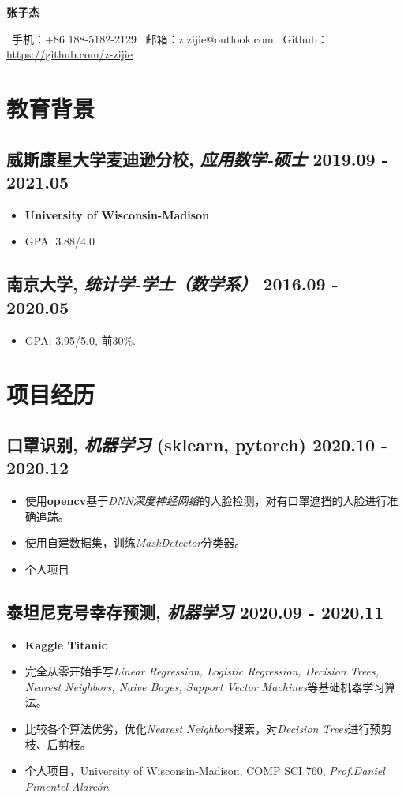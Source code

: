 \documentclass[11pt]{article}
\newcommand{\datedsubsection}[2]{%
    \subsection[#1]{#1 \hfill #2}%
}
\newcommand{\name}[1]{
    \centerline{\Huge\scshape\textbf{#1}}
    \vspace{1.2ex}
}
\newcommand{\contactInfo}[3]{
    \centerline{
        \sffamily\large{
            \ 手机：{#1} \textperiodcentered
            \ 邮箱：{#2} \textperiodcentered
            \ {Github}：\normalsize\url{#3}
            }
        } 
    \vspace{1.2ex}
}
\begin{document}
\name{张子杰}
\contactInfo{+86 188-5182-2129}{z.zijie@outlook.com}{https://github.com/z-zijie}

\section{\textbf{教育背景}}
\datedsubsection{
    \textbf{威斯康星大学麦迪逊分校},
    \textit{应用数学-硕士}}
    {2019.09 - 2021.05}
    \begin{itemize} [parsep=1ex]
        \item \textbf{University of Wisconsin-Madison}
        \item GPA: 3.88/4.0
    \end{itemize}

\datedsubsection{
    \textbf{南京大学},
    \textit{统计学-学士（数学系）}}
    {2016.09 - 2020.05}
    \begin{itemize} [parsep=1ex]
        \item GPA: 3.95/5.0, 前30\%.
    \end{itemize}

\hspace*{\fill}
\section{\textbf{项目经历}}
\datedsubsection{
    \textbf{口罩识别},
    \textit{机器学习}
    (sklearn, pytorch)}
    {2020.10 - 2020.12}
    \begin{itemize} [parsep=1ex]
        \item 使用\textbf{opencv}基于\textit{DNN深度神经网络}的人脸检测，对有口罩遮挡的人脸进行准确追踪。
        \item 使用自建数据集，训练\textit{MaskDetector}分类器。
        \item 个人项目
    \end{itemize}

\datedsubsection{
    \textbf{泰坦尼克号幸存预测},
    \textit{机器学习}}
    {2020.09 - 2020.11}
    \begin{itemize} [parsep=1ex]
        \item \textbf{Kaggle Titanic}
        \item 完全从零开始手写\textit{Linear Regression, Logistic Regression, Decision Trees, Nearest Neighbors, Naive Bayes, Support Vector Machines}等基础机器学习算法。
        \item 比较各个算法优劣，优化\textit{Nearest Neighbors}搜索，对\textit{Decision Trees}进行预剪枝、后剪枝。
        \item 个人项目，University of Wisconsin-Madison, COMP SCI 760, \textit{Prof.Daniel Pimentel-Alarcón}.
    \end{itemize}
\end{document}
